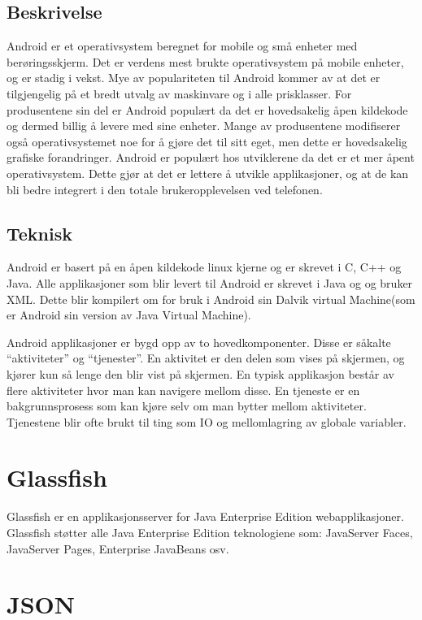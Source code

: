 \documentclass[../main.tex]{subfiles}
\begin{document}
\subsection{Beskrivelse}
Android er et operativsystem beregnet for mobile og små enheter med berøringsskjerm. Det er verdens mest brukte operativsystem på mobile enheter, og er stadig i vekst. Mye av populariteten til Android kommer av at det er tilgjengelig på et bredt utvalg av maskinvare og i alle prisklasser. For produsentene sin del er Android populært da det er hovedsakelig åpen kildekode og dermed billig å levere med sine enheter. Mange av produsentene modifiserer også operativsystemet noe for å gjøre det til sitt eget, men dette er hovedsakelig grafiske forandringer.
Android er populært hos utviklerene da det er et mer åpent operativsystem. Dette gjør at det er lettere å utvikle applikasjoner, og at de kan bli bedre integrert i den totale brukeropplevelsen ved telefonen.

\subsection{Teknisk}
Android er basert på en åpen kildekode linux kjerne og er skrevet i C, C++ og Java. Alle applikasjoner som blir levert til Android er skrevet i Java og og bruker XML. Dette blir kompilert om for bruk i Android sin Dalvik virtual Machine(som er Android sin version av Java Virtual Machine).

Android applikasjoner er bygd opp av to hovedkomponenter. Disse er såkalte “aktiviteter” og “tjenester”. En aktivitet er den delen som vises på skjermen, og kjører kun så lenge den blir vist på skjermen. En typisk applikasjon består av flere aktiviteter hvor man kan navigere mellom disse.
En tjeneste er en bakgrunnsprosess som kan kjøre selv om man bytter mellom aktiviteter. Tjenestene blir ofte brukt til ting som IO og mellomlagring av globale variabler.

\section{Glassfish}
Glassfish er en applikasjonsserver for Java Enterprise Edition webapplikasjoner. Glassfish støtter alle Java Enterprise Edition teknologiene som: JavaServer Faces, JavaServer Pages, Enterprise JavaBeans osv. 

\section{JSON}
\end{document}
